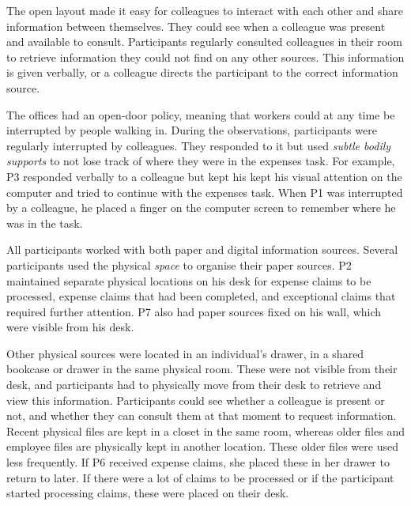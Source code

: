 The open layout made it easy for colleagues to interact with each other and share information between themselves. They could see when a colleague was present and available to consult. Participants regularly consulted colleagues in their room to retrieve information they could not find on any other sources. This information is given verbally, or a colleague directs the participant to the correct information source.

The offices had an open-door policy, meaning that workers could at any time be interrupted by people walking in. During the observations, participants were regularly interrupted by colleagues. They responded to it but used \textit{subtle bodily supports} to not lose track of where they were in the expenses task. For example, P3 responded verbally to a colleague but kept his kept his visual attention on the computer and tried to continue with the expenses task. When P1 was interrupted by a colleague, he placed a finger on the computer screen to remember where he was in the task.


All participants worked with both paper and digital information sources. Several participants used the physical \textit{space} to organise their paper sources. P2 maintained separate physical locations on his desk for expense claims to be processed, expense claims that had been completed, and exceptional claims that required further attention. P7 also had paper sources fixed on his wall, which were visible from his desk. 

Other physical sources were located in an individual's drawer, in a shared bookcase or drawer in the same physical room. These were not visible from their desk, and participants had to physically move from their desk to retrieve and view this information. Participants could see whether a colleague is present or not, and whether they can consult them at that moment to request information. Recent physical files are kept in a closet in the same room, whereas older files and employee files are physically kept in another location. These older files were used less frequently.
If P6 received expense claims, she placed these in her drawer to return to later. If there were a lot of claims to be processed or if the participant started processing claims, these were placed on their desk. 

